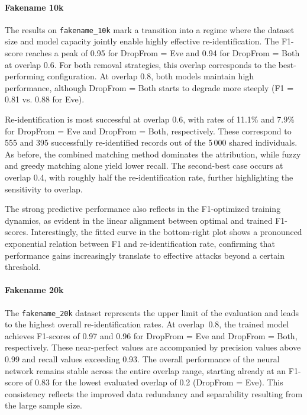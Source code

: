 \paragraph{Fakename 10k}

The results on \texttt{fakename\_10k} mark a transition into a regime where the dataset size and model capacity jointly enable highly effective re-identification. The F1-score reaches a peak of 0.95 for DropFrom = Eve and 0.94 for DropFrom = Both at overlap 0.6. For both removal strategies, this overlap corresponds to the best-performing configuration. At overlap 0.8, both models maintain high performance, although DropFrom = Both starts to degrade more steeply (F1 = 0.81 vs. 0.88 for Eve).

Re-identification is most successful at overlap 0.6, with rates of 11.1\% and 7.9\% for DropFrom = Eve and DropFrom = Both, respectively. These correspond to 555 and 395 successfully re-identified records out of the 5\,000 shared individuals. As before, the combined matching method dominates the attribution, while fuzzy and greedy matching alone yield lower recall. The second-best case occurs at overlap 0.4, with roughly half the re-identification rate, further highlighting the sensitivity to overlap.

The strong predictive performance also reflects in the F1-optimized training dynamics, as evident in the linear alignment between optimal and trained F1-scores. Interestingly, the fitted curve in the bottom-right plot shows a pronounced exponential relation between F1 and re-identification rate, confirming that performance gains increasingly translate to effective attacks beyond a certain threshold.


\paragraph{Fakename 20k}

The \texttt{fakename\_20k} dataset represents the upper limit of the evaluation and leads to the highest overall re-identification rates. At overlap~0.8, the trained model achieves F1-scores of 0.97 and 0.96 for DropFrom = Eve and DropFrom = Both, respectively. These near-perfect values are accompanied by precision values above 0.99 and recall values exceeding 0.93. The overall performance of the neural network remains stable across the entire overlap range, starting already at an F1-score of 0.83 for the lowest evaluated overlap of 0.2 (DropFrom = Eve). This consistency reflects the improved data redundancy and separability resulting from the large sample size.

